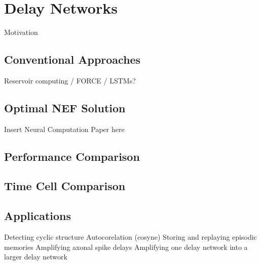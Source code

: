\chapter{Delay Networks}
\label{chapt:delays}

Motivation

\section{Conventional Approaches}

Reservoir computing / FORCE / LSTMs?

\section{Optimal NEF Solution}

Insert Neural Computation Paper here

\section{Performance Comparison}

\section{Time Cell Comparison}

\section{Applications}
\label{sec:delay-applications}

Detecting cyclic structure
Autocorelation (cosyne)
Storing and replaying episodic memories
Amplifying axonal spike delays
Amplifying one delay network into a larger delay network
